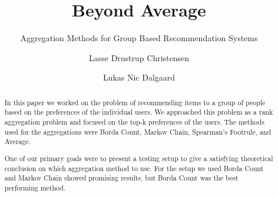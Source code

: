 \documentclass[sigplan]{acmart}
\begin{document}
\title{Beyond Average}
\subtitle{Aggregation Methods for Group Based Recommendation Systems}

\author{Lasse Drustrup Christensen}

\author{Lukas Nic Dalgaard}



\begin{abstract}
In this paper we worked on the problem of recommending items to a group of people based on the preferences of the individual users. We approached this problem as a rank aggregation problem and focused on the top-k preferences of the users.
The methods used for the aggregations were Borda Count, Markov Chain, Spearman's Footrule, and Average.

One of our primary goals were to present a testing setup to give a satisfying theoretical conclusion on which aggregation method to use. For the setup we used Borda Count and Markov Chain showed promising results, but Borda Count was the best performing method.
\end{abstract}



\maketitle



%







 

\clearpage


\end{document}
